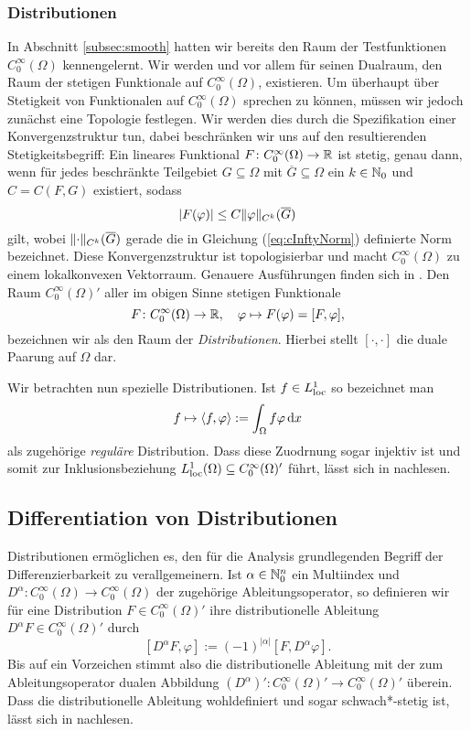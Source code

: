 \subsubsection{Distributionen}

In Abschnitt \ref{subsec:smooth} hatten wir bereits den Raum der Testfunktionen $C_0^\infty(\Omega)$ kennengelernt.
Wir werden und vor allem für seinen Dualraum, den Raum der stetigen Funktionale auf $C_0^\infty(\Omega)$, existieren.
Um überhaupt über Stetigkeit von Funktionalen auf $C_0^\infty(\Omega)$ sprechen zu können, müssen wir jedoch zunächst eine Topologie festlegen.
Wir werden dies durch die Spezifikation einer Konvergenzstruktur tun, dabei beschränken wir uns auf den resultierenden Stetigkeitsbegriff:
Ein lineares Funktional $F \colon C_0^\infty(\Omega) \to \mathbb{R}$ ist stetig, genau dann, wenn für jedes beschränkte Teilgebiet $G \subseteq \Omega$ mit $\overline G \subseteq \Omega$ ein $k \in \mathbb{N}_0$ und $C = C(F,G)$ existiert, sodass
$$
|F(\varphi)| \leq C \lVert \varphi \rVert_{C^k}(\overline G)
$$
gilt, wobei $\lVert \cdot \rVert_{C^k}(\overline G)$ gerade die in Gleichung (\ref{eq:cInftyNorm}) definierte Norm bezeichnet.
Diese Konvergenzstruktur ist topologisierbar und macht $C_0^\infty(\Omega)$ zu einem lokalkonvexen Vektorraum.
Genauere Ausführungen finden sich in \cite[S.433f.]{werner2011fa}.
Den Raum $C_0^\infty(\Omega)'$ aller im obigen Sinne stetigen Funktionale
$$
F \colon C_0^\infty(\Omega) \to \mathbb{R}, \quad \varphi \mapsto F(\varphi) = [F, \varphi],
$$
bezeichnen wir als den Raum der \emph{Distributionen}.
Hierbei stellt $[\cdot,\cdot]$ die duale Paarung auf $\Omega$ dar. 

Wir betrachten nun spezielle Distributionen.
Ist $f \in L^1_{\operatorname{loc}}$ so bezeichnet man 
$$
f \mapsto \langle f, \varphi \rangle := \int_\Omega f \varphi \, {\operatorname{d}\!{x}}
$$
als zugehörige \emph{reguläre} Distribution.
Dass diese Zuodrnung sogar injektiv ist und somit zur Inklusionsbeziehung $L^1_{\operatorname{loc}}(\Omega) \subseteq C^\infty_0(\Omega)'$ führt, lässt sich in \cite[S.432, Beispiel (a)]{werner2011fa} nachlesen.

\subsection{Differentiation von Distributionen}

Distributionen ermöglichen es, den für die Analysis grundlegenden Begriff der Differenzierbarkeit zu verallgemeinern.
Ist $\alpha \in \mathbb{N}_0^n$ ein Multiindex und $D^\alpha \colon C_0^\infty(\Omega) \to C_0^\infty(\Omega)$ der zugehörige Ableitungsoperator, so definieren wir für eine Distribution $F \in C_0^\infty(\Omega)'$ ihre distributionelle Ableitung $D^\alpha F \in C_0^\infty(\Omega)'$ durch
$$
  [D^\alpha F, \varphi] := (-1)^{|\alpha|} [F, D^\alpha \varphi].
$$
Bis auf ein Vorzeichen stimmt also die distributionelle Ableitung mit der zum Ableitungsoperator dualen Abbildung $(D^\alpha)' \colon C_0^\infty(\Omega)' \to C_0^\infty(\Omega)'$ überein.
Dass die distributionelle Ableitung wohldefiniert und sogar schwach*-stetig ist, lässt sich in \cite[S.434, Lemma VIII.5.7]{werner2011fa} nachlesen.


